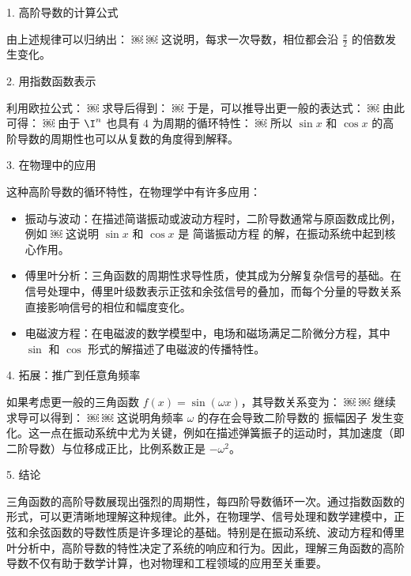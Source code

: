 1. 高阶导数的计算公式

由上述规律可以归纳出：
￼
￼
这说明，每求一次导数，相位都会沿 $\frac{\pi}{2}$ 的倍数发生变化。



2. 用指数函数表示

利用欧拉公式：
￼
求导后得到：
￼
于是，可以推导出更一般的表达式：
￼
由此可得：
￼
由于 $\I^n$ 也具有 $4$ 为周期的循环特性：
￼
所以 $\sin x$ 和 $\cos x$ 的高阶导数的周期性也可以从复数的角度得到解释。

3. 在物理中的应用

这种高阶导数的循环特性，在物理学中有许多应用：
\begin{itemize}
\item 振动与波动：在描述简谐振动或波动方程时，二阶导数通常与原函数成比例，例如
￼
这说明 $\sin x$ 和 $\cos x$ 是 简谐振动方程 的解，在振动系统中起到核心作用。
\item 傅里叶分析：三角函数的周期性求导性质，使其成为分解复杂信号的基础。在信号处理中，傅里叶级数表示正弦和余弦信号的叠加，而每个分量的导数关系直接影响信号的相位和幅度变化。
\item 电磁波方程：在电磁波的数学模型中，电场和磁场满足二阶微分方程，其中 $\sin$ 和 $\cos$ 形式的解描述了电磁波的传播特性。
\end{itemize}

4. 拓展：推广到任意角频率

如果考虑更一般的三角函数 $f(x) = \sin(\omega x)$，其导数关系变为：
￼
￼
继续求导可以得到：
￼
￼
这说明角频率 $\omega$ 的存在会导致二阶导数的 振幅因子 发生变化。这一点在振动系统中尤为关键，例如在描述弹簧振子的运动时，其加速度（即二阶导数）与位移成正比，比例系数正是 $-\omega^2$。

5. 结论

三角函数的高阶导数展现出强烈的周期性，每四阶导数循环一次。通过指数函数的形式，可以更清晰地理解这种规律。此外，在物理学、信号处理和数学建模中，正弦和余弦函数的导数性质是许多理论的基础。特别是在振动系统、波动方程和傅里叶分析中，高阶导数的特性决定了系统的响应和行为。因此，理解三角函数的高阶导数不仅有助于数学计算，也对物理和工程领域的应用至关重要。